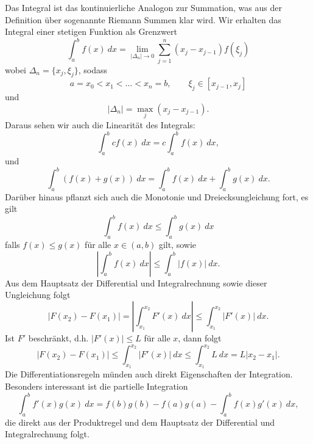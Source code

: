 \documentclass[letterpaper,10pt,english]{jupyterBook}
\begin{document}
Das Integral ist das kontinuierliche Analogon zur Summation, was aus der Definition über sogenannte Riemann Summen klar wird. Wir erhalten das Integral einer stetigen Funktion als Grenzwert
\begin{equation*}
 \int_a^b f(x)~dx = \lim_{|\Delta_n| \rightarrow 0} \sum_{j=1}^n (x_j - x_{j-1}) f(\xi_j)\end{equation*}
wobei \(\Delta_n = \{x_j,\xi_j\}\), sodass
\begin{equation*}
 a = x_0 < x_1 < \ldots < x_n =b, \qquad \xi_j \in [x_{j-1},x_j]
\end{equation*}
und
\begin{equation*}
 \vert \Delta_n \vert = \max_j (x_j - x_{j-1}).\end{equation*}
Daraus sehen wir auch die Linearität des Integrals:
\begin{equation*}
 \int_a^b  c f(x) ~dx = c \int_a^b   f(x) ~dx,\end{equation*}
und
\begin{equation*}
 \int_a^b   ( f(x) + g(x)) ~dx = \int_a^b   f(x) ~dx + \int_a^b   g(x) ~dx.\end{equation*}
Darüber hinaus pflanzt sich auch die Monotonie und Dreiecksungleichung fort, es gilt
\begin{equation*}
 \int_a^b   f(x) ~dx \leq  \int_a^b   g(x) ~dx \end{equation*}
falls \(f(x) \leq g(x)\) für alle \(x \in (a,b)\) gilt, sowie
\begin{equation*}
 \left\vert \int_a^b   f(x) ~dx \right\vert \leq  \int_a^b  \vert  f(x) \vert ~dx .\end{equation*}
Aus dem Hauptsatz der Differential  und Integralrechnung sowie dieser Ungleichung folgt
\begin{equation*}
\vert F(x_2) - F(x_1) \vert = \left\vert \int_{x_1}^{x_2}   F'(x) ~dx \right\vert
\leq  \int_{x_1}^{x_2}  \vert F'(x) \vert ~dx.
\end{equation*}
Ist \(F'\) beschränkt, d.h. \(\vert F'(x) \vert \leq L\) für alle \(x\), dann folgt
\begin{equation*}
 \vert F(x_2) - F(x_1) \vert \leq  \int_{x_1}^{x_2}  \vert F'(x) \vert ~dx
\leq  \int_{x_1}^{x_2}  L ~dx = L \vert x_2 - x_1 \vert.
\end{equation*}
Die Differentiationsregeln münden auch direkt Eigenschaften der Integration. Besonders interessant ist die partielle Integration
\begin{equation*}
  \int_a^b f'(x) g(x)~dx = f(b) g(b) - f(a) g(a) - \int_a^b f(x) g'(x)~dx,\end{equation*}
die direkt aus der Produktregel und dem Hauptsatz der Differential  und Integralrechnung folgt.
\end{document}
